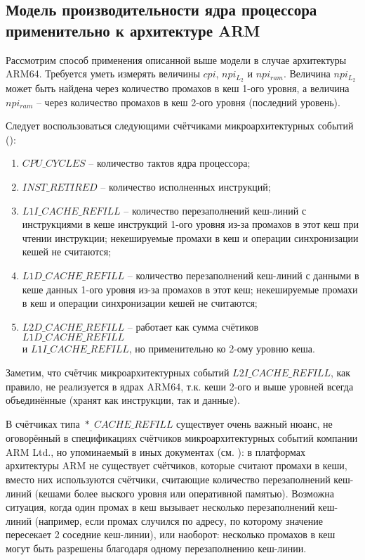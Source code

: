 \subsection{Модель производительности ядра процессора применительно к архитектуре ARM} \label{model_counters}

    Рассмотрим способ применения описанной выше модели в случае архитектуры ARM64.
    Требуется уметь измерять величины $cpi$, $npi_{L_2}$ и $npi_{ram}$. Величина $npi_{L_2}$
    может быть найдена через количество промахов в кеш 1-ого уровня, а величина $npi_{ram}$ --
    через количество промахов в кеш 2-ого уровня (последний уровень).

    Следует воспользоваться следующими счётчиками микроархитектурных событий (\cite{ArmPMUjson}):
    \begin{enumerate}
        \item $CPU\_CYCLES$ -- количество тактов ядра процессора;
        \item $INST\_RETIRED$ -- количество исполненных инструкций;
        \item $L1I\_CACHE\_REFILL$ -- количество перезаполнений кеш-линий с инструкциями в кеше
        инструкций 1-ого уровня из-за промахов в этот кеш при чтении инструкции;
        некешируемые промахи в кеш и операции синхронизации кешей не считаются;
        \item $L1D\_CACHE\_REFILL$ -- количество перезаполнений кеш-линий с данными в кеше данных
        1-ого уровня из-за промахов в этот кеш;
        некешируемые промахи в кеш и операции синхронизации кешей не считаются;
        \item $L2D\_CACHE\_REFILL$ -- работает как сумма счётиков $L1D\_CACHE\_REFILL$ \\ и
        $L1I\_CACHE\_REFILL$, но применительно ко 2-ому уровню кеша.
    \end{enumerate}

    Заметим, что счётчик микроархитектурных событий $L2I\_CACHE\_REFILL$, как правило, не реализуется
    в ядрах ARM64, т.к. кеши 2-ого и выше уровней всегда объединённые (хранят как инструкции, так и данные).

    В счётчиках типа $*_\_CACHE\_REFILL$ существует очень важный нюанс, не оговорённый
    в спецификациях счётчиков микроархитектурных событий компании ARM Ltd., но упоминаемый
    в иных документах (см. \cite{ArmPerfAnalyses}): в платформах архитектуры ARM не существует счётчиков,
    которые считают промахи в кеши, вместо них используются счётчики, считающие
    количество перезаполнений кеш-линий (кешами более выского уровня или оперативной памятью).
    Возможна ситуация, когда один промах в кеш вызывает несколько перезаполнений кеш-линий
    (например, если промах случился по адресу, по которому значение пересекает 2 соседние кеш-линии),
    или наоборот: несколько промахов в кеш могут быть разрешены благодаря одному перезаполнению кеш-линии.

